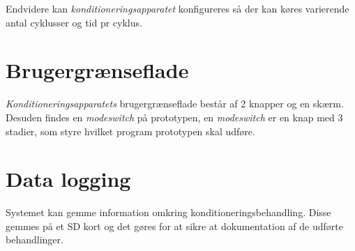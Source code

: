 Endvidere kan \textit{konditioneringsapparatet} konfigureres så der kan køres varierende antal cyklusser og tid pr cyklus.


\section{Brugergrænseflade}
\textit{Konditioneringsapparatets} brugergrænseflade består af 2 knapper og en skærm. Desuden findes en \textit{modeswitch} på prototypen, en \textit{modeswitch} er en knap med 3 stadier, som styre hvilket program prototypen skal udføre.  

\section{Data logging}
Systemet kan gemme information omkring konditioneringsbehandling. Disse gemmes på et SD kort og det gøres for at sikre at dokumentation af de udførte behandlinger.